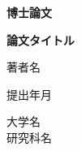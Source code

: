 \begin{titlepage}
\begin{center}

\vspace*{2cm}

{\huge \textbf{博士論文}}

\vspace{2cm}

{\LARGE \textbf{論文タイトル}}

\vspace{2cm}

{\Large 著者名}

\vspace{2cm}

{\large 提出年月}

\vfill

{\large 大学名\\
研究科名}

\end{center}
\end{titlepage} 